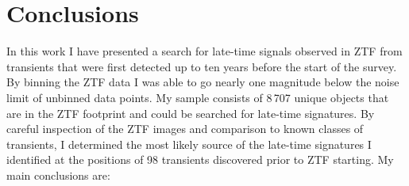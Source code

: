 \documentclass[a4paper,oneside,12pt, class=Latex/Classes/PhDthesisPSnPDF, crop=false]{standalone}
\begin{document}
\section{Conclusions}
\label{Pre-ZTF_conclusions}
In this work I have presented a search for late-time signals observed in ZTF from transients that were first detected up to ten years before the start of the survey. By binning the ZTF data I was able to go nearly one magnitude below the noise limit of unbinned data points. My sample consists of 8\,707 unique objects that are in the ZTF footprint and could be searched for late-time signatures. By careful inspection of the ZTF images and comparison to known classes of transients, I determined the most likely source of the late-time signatures I identified at the positions of 98 transients discovered prior to ZTF starting. My main conclusions are:
\end{document}
